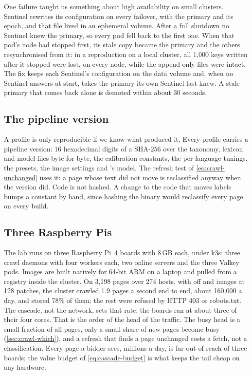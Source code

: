 One failure taught us something about high availability on small clusters. Sentinel rewrites its configuration on every failover, with the primary and its epoch, and that file lived in an ephemeral volume. After a full shutdown no Sentinel knew the primary, so every pod fell back to the first one. When that pod's node had stopped first, its stale copy became the primary and the others resynchronised from it: in a reproduction on a local cluster, all 1,000 keys written after it stopped were lost, on every node, while the append-only files were intact. The fix keeps each Sentinel's configuration on the data volume and, when no Sentinel answers at start, takes the primary its own Sentinel last knew. A stale primary that comes back alone is demoted within about 30 seconds.

\subsection{The pipeline version}\label{sec:impl-version}

A profile is only reproducible if we know what produced it. Every profile carries a pipeline version: 16 hexadecimal digits of a SHA-256 over the taxonomy, lexicon and model files byte for byte, the calibration constants, the per-language tunings, the presets, the image settings and 's model. The refresh test of \cref{eq:crawl-unchanged} uses it: a page whose text did not move is reclassified anyway when the version did. Code is not hashed. A change to the code that moves labels bumps a constant by hand, since hashing the binary would reclassify every page on every build.

\subsection{Three Raspberry Pis}\label{sec:impl-pi}

The lab runs on three Raspberry Pi~4 boards with 8\,GB each, under k3s: three crawl daemons with four workers each, two online servers and the three Valkey pods. Images are built natively for 64-bit ARM on a laptop and pulled from a registry inside the cluster. On 3,198 pages over 274 hosts, with  off and images at 128 patches, the cluster crawled 1.9 pages a second end to end, about 160,000 a day, and stored 78\% of them; the rest were refused by HTTP 403 or robots.txt. The cascade, not the network, sets that rate: the boards ran at about three of their four cores. That is the order of the head of the traffic. The busy head is a small fraction of all pages, only a small share of new pages become busy (\cref{sec:crawl-which}), and a refresh that finds a page unchanged costs a fetch, not a classification. Every page a bidder sees, millions a day, is far out of reach of three boards; the value budget of \cref{eq:cascade-budget} is what keeps the tail cheap on any hardware.

